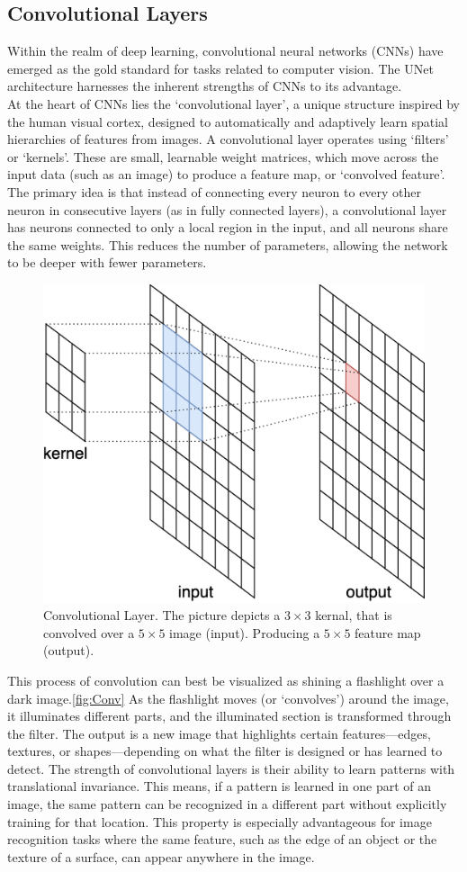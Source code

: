 \subsection{Convolutional Layers}
Within the realm of deep learning, convolutional neural networks (CNNs) have emerged as the gold standard for tasks related to computer vision.
The UNet architecture harnesses the inherent strengths of CNNs to its advantage.\\
\noindent At the heart of CNNs lies the `convolutional layer', a unique structure inspired by the human visual cortex, designed to automatically and adaptively learn spatial hierarchies of features from images.
A convolutional layer operates using `filters' or `kernels'. These are small, learnable weight matrices, which move across the input data (such as an image) to produce a feature map, or `convolved feature'.
The primary idea is that instead of connecting every neuron to every other neuron in consecutive layers (as in fully connected layers),
a convolutional layer has neurons connected to only a local region in the input, and all neurons share the same weights. This reduces the number of parameters,
allowing the network to be deeper with fewer parameters.\cite{oshea_introduction_2015}

\begin{figure}[!hb]
	\centering
	\includegraphics[width=0.4\linewidth]{images/Convolution}
	\caption{Convolutional Layer. The picture depicts a $3\times3$ kernal, that is convolved over a $5\times5$ image (input). Producing a $5\times5$ feature map (output).}
	\label{fig:Conv}
\end{figure}

This process of convolution can best be visualized as shining a flashlight over a dark image.\autoref{fig:Conv} As the flashlight moves (or `convolves') around the image,
it illuminates different parts, and the illuminated section is transformed through the filter. The output is a new image that highlights certain features—edges,
textures, or shapes—depending on what the filter is designed or has learned to detect.
The strength of convolutional layers is their ability to learn patterns with translational invariance. This means,
if a pattern is learned in one part of an image, the same pattern can be recognized in a different part without explicitly training for that location.
This property is especially advantageous for image recognition tasks where the same feature, such as the edge of an object or the texture of a surface, can appear anywhere in the image.

